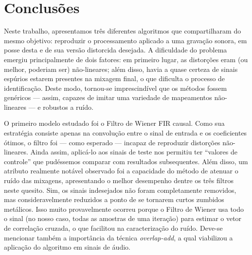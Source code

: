 \chapter{Conclusões}
\label{chapter:conclusion}

Neste trabalho, apresentamos três diferentes algoritmos que compartilharam do mesmo objetivo: reproduzir o processamento aplicado a uma gravação sonora, em posse desta e de sua versão distorcida desejada. A dificuldade do problema emergiu principalmente de dois fatores: em primeiro lugar, as distorções eram (ou melhor, poderiam ser) não-lineares; além disso, havia a quase certeza de sinais espúrios estarem presentes na mixagem final, o que dificulta o processo de identificação. Deste modo, tornou-se imprescindível que os métodos fossem genéricos --- assim, capazes de imitar uma variedade de mapeamentos não-lineares --- e robustos a ruído.

O primeiro modelo estudado foi o Filtro de Wiener FIR causal. Como sua estratégia consiste apenas na convolução entre o sinal de entrada e os coeficientes ótimos, o filtro foi --- como esperado --- incapaz de reproduzir distorções não-lineares. Ainda assim, aplicá-lo aos sinais de teste nos permitiu ter ``valores de controle'' que pudéssemos comparar com resultados subsequentes. Além disso, um atributo realmente notável observado foi a capacidade do método de atenuar o ruído das mixagens, apresentando o melhor desempenho dentre os três filtros neste quesito. Sim, os sinais indesejados não foram completamente removidos, mas consideravelmente reduzidos a ponto de se tornarem curtos zumbidos metálicos. Isso muito provavelmente ocorreu porque o Filtro de Wiener usa todo o sinal (no nosso caso, todas as amostras de uma iteração) para estimar o vetor de correlação cruzada, o que facilitou na caracterização do ruído. Deve-se mencionar também a importância da técnica \textit{overlap-add}, a qual viabilizou a aplicação do algoritmo em sinais de áudio.

